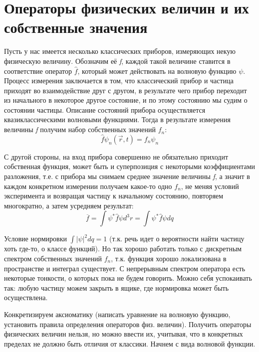 \newpage
\chapter{Операторы физических величин и их собственные значения}

\par Пусть у нас имеется несколько классических приборов, измеряющих некую физическую величину. Обозначим её \textit{f}, каждой такой величине ставится в соответствие оператор $\hat{f}$, который может действовать на волновую функцию $\psi$. Процесс измерения заключается в том, что классический прибор и частица приходят во взаимодействие друг с другом, в результате чего прибор переходит из начального в некоторое другое состояние, и по этому состоянию мы судим о состоянии частицы. Описание состояний прибора осуществляется квазиклассическими волновыми функциями. Тогда в результате измерения величины \textit{f} получим набор собственных значений $f_n$:
$$ \hat{f} \psi _n (\vec{r}, t) = f_n \psi_n $$
\par С другой стороны, на вход прибора совершенно не обязательно приходит собственная функция, может быть и суперпозиция с некоторыми коэффициентами разложения, т.е. с прибора мы снимаем среднее значение величины \textit{f}, а значит в каждом конкретном измерении получаем какое-то одно $f_n$, не меняя условий эксперимента и возвращая частицу к начальному состоянию, повторяем многократно, а затем усредняем результат:
$$ \overline{f} = \int \psi ^* \hat{f} \psi d^3r =  \int \psi ^* \hat{f} \psi dq$$
\par Условие нормировки $\int |\psi|^2 dq = 1$ (т.к. речь идет о вероятности найти частицу хоть где-то, о классе функций). Но так хорошо работать только с дискретным спектром собственных значений $f_n$, т.к. функция хорошо локализована в пространстве и интеграл существует. С непрерывным спектром оператора есть некоторые тонкости, о которых пока не будем  говорить. Можно себя успокаивать так: любую частицу можем закрыть в ящике, где нормировка может быть осуществлена.
\par Конкретизируем аксиоматику (написать уравнение на волновую функцию, установить правила определения операторов физ. величин). Получить операторы физических величин нельзя, но можно ввести их, учитывая, что в конкретных пределах не должно быть отличия от классики. Начнем с вида волновой функции.

